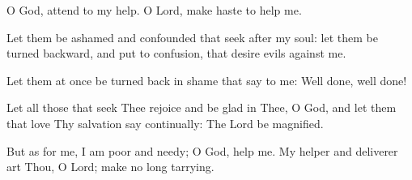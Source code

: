 O God, attend to my help. O Lord, make haste to help me.

Let them be ashamed and confounded that seek after my soul: let them be turned backward, and put to confusion, that desire evils against me.

Let them at once be turned back in shame that say to me: Well done, well done!

Let all those that seek Thee rejoice and be glad in Thee, O God, and let them that love Thy salvation say continually: The Lord be magnified.

But as for me, I am poor and needy; O God, help me. My helper and deliverer art Thou, O Lord; make no long tarrying.
